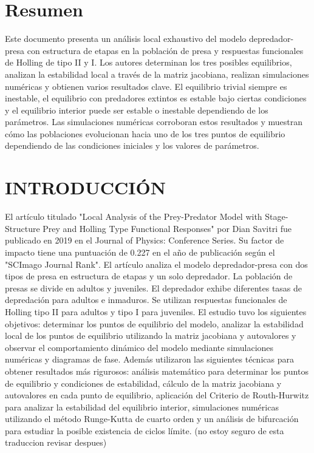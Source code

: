 \documentclass{wscpaperproc}
\theoremstyle{wsc}
\begin{document}
\maketitle

\section*{Resumen}
Este documento presenta un análisis local exhaustivo del modelo depredador-presa con estructura de
etapas en la población de presa y respuestas funcionales de Holling de tipo II y I. Los autores determinan
los tres posibles equilibrios, analizan la estabilidad local a través de la matriz jacobiana, realizan
simulaciones numéricas y obtienen varios resultados clave. El equilibrio trivial siempre es inestable,
el equilibrio con predadores extintos es estable bajo ciertas condiciones y el equilibrio interior puede
ser estable o inestable dependiendo de los parámetros. Las simulaciones numéricas corroboran estos resultados
y muestran cómo las poblaciones evolucionan hacia uno de los tres puntos de equilibrio dependiendo de las
condiciones iniciales y los valores de parámetros.

\section{INTRODUCCI\'ON}
\label{sec:intro}
El artículo titulado "Local Analysis of the Prey-Predator Model with Stage-Structure Prey and Holling
Type Functional Responses" por Dian Savitri fue publicado en 2019
en el Journal of Physics: Conference Series. Su factor de impacto tiene una puntuaci\'on de 0.227 en el año de
publicación según el "SCImago Journal Rank". El artículo analiza el modelo depredador-presa con dos tipos de presa en estructura
de etapas y un solo depredador. La población de presas se divide en adultos y juveniles. El depredador
exhibe diferentes tasas de depredación para adultos e inmaduros. Se utilizan respuestas funcionales de
Holling tipo II \cite{holling_functional_1965} para adultos y tipo I para juveniles. El estudio tuvo los siguientes objetivos:
determinar los puntos de equilibrio del modelo, analizar la estabilidad local de los puntos de equilibrio
utilizando la matriz jacobiana y autovalores y observar el comportamiento dinámico del modelo mediante
simulaciones numéricas y diagramas de fase. Además utilizaron las siguientes técnicas para obtener resultados
más rigurosos: análisis matemático para determinar los puntos de equilibrio y condiciones de estabilidad,
cálculo de la matriz jacobiana y autovalores en cada punto de equilibrio, aplicación del Criterio de Routh-Hurwitz
para analizar la estabilidad del equilibrio interior, simulaciones numéricas utilizando el método Runge-Kutta de
cuarto orden y un análisis de bifurcación para estudiar la posible existencia de ciclos límite. (no estoy seguro de esta traduccion revisar despues)
\end{document}
